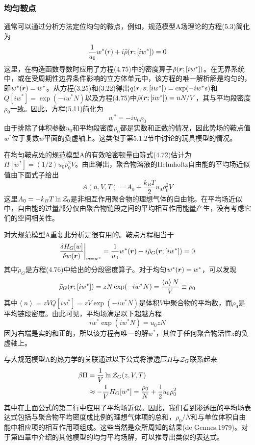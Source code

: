 \subsubsection{均匀鞍点}
通常可以通过分析方法定位均匀的鞍点，例如，规范模型A场理论的方程(5.3)简化为
\begin{equation}
\frac{1}{u_0}w^*(r)+i\tilde{\rho}(\bm{r};[iw^*])=0
\end{equation}
这里，在构造函数导数时应用了方程(4.75)中的密度算子$\tilde{\rho}(\bm{r};[iw^*])$。在无界系统中，或在受周期性边界条件影响的立方体单元中，该方程的唯一解析解是均匀的，即$w^*(\bm{r})=w^*$。从方程(3.25)和(3.22)得出$q(\bm{r},s;[iw^*])=\exp(-iw^*s)$和$Q[iw^*]=\exp(-iw^*N)$以及方程(4.75)中$\tilde{\rho}(\bm{r};[iw^*])=nN/V$，其与平均段密度$\rho_0$一致。因此，方程(5.11)简化为
\begin{equation}
w^*=-iu_0\rho_0
\end{equation}
由于排除了体积参数$u_0$和平均段密度$\rho_0$都是实数和正数的情况，因此势场的鞍点值$w^*$位于复数$w$平面的负虚轴上。这类似于第5.1.2节中讨论的玩具模型的情况。

在均匀鞍点处的规范模型A的有效哈密顿量由等式(4.72)估计为$H[w^*]=(1/2)u_0\rho_0^2V$。由此得出，聚合物溶液的Helmholtz自由能的平均场近似值由下面式子给出
\begin{equation}
A(n,V,T)=A_0+\frac{k_BT}{2}u_0\rho_0^2V
\end{equation}
这里$A_0=-k_BT\ln\mathcal{Z}_0$是非相互作用聚合物的理想气体的自由能。在平均场近似中，自由能的过量部分仅由聚合物链段之间的平均相互作用能量产生，没有考虑它们的空间相关性。

对大规范模型A重复此分析是很有用的。鞍点方程相当于
\begin{equation}
\frac{\delta H_G[w]}{\delta w(\bm{r})}\bigg|_{w=w^*}=\frac{1}{u_0}w^*(\bm{r})+i\tilde{\rho}_G(\bm{r};[iw^*])=0
\end{equation}
其中$\tilde{\rho}_G$是方程(4.76)中给出的分段密度算子。对于均匀$w^*(\bm{r})=w^*$，可以发现
\begin{equation}
\tilde{\rho}_G(\bm{r};[iw^*])=zN\exp(-iw^*N)=\frac{\left\langle n\right\rangle N}{V}\equiv\rho_0
\end{equation}
其中$\left\langle n\right\rangle=zVQ[iw^*]=zV\exp(-iw^*N)$是体积$V$中聚合物的平均数，而$\rho_0$是平均链段密度。由此可见，平均场满足以下超越方程
\begin{equation}
iw^*\exp(iw^*N)=u_0zN
\end{equation}
因为右端是实的和正的，所以该方程有唯一的解$w^*$，其位于任何聚合物活性$z$的负虚轴上。

与大规范模型A的热力学的关联通过以下公式将渗透压$\Pi$与$\mathcal{Z}_G$联系起来
\begin{equation}
\begin{aligned}
\beta\Pi&=\frac{1}{V}\ln\mathcal{Z}_G(z,V,T)\\
&\approx-\frac{1}{V}H_G[w^*]=\frac{\rho_0}{N}+\frac{1}{2}u_0\rho_0^2
\end{aligned}
\end{equation}
其中在上面公式的第二行中应用了平均场近似。因此，我们看到渗透压的平均场表达式包括与聚合物平均密度成比例的理想气体项的总和，$\rho_0/N$和与单位体积自由能中相应项的相互作用项组成。这些当然是众所周知的结果(de Gennes,1979)。对于第四章中介绍的其他模型的均匀平均场解，可以推导出类似的表达式。

